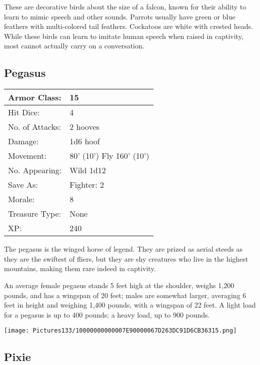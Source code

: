 \documentclass[a4paper,twoside,openany,10pt]{book}
\begin{document}
\begin{multicols}{2}
These are decorative birds about the size of a falcon, known for their ability to learn to mimic speech and other sounds. Parrots usually have green or blue feathers with multi-colored tail feathers. Cockatoos are white with crested heads. While these birds can learn to imitate human speech when raised in captivity, most cannot actually carry on a conversation.

\subsection*{Pegasus}\label{pegasus}

\begin{tabularx}{0.50\textwidth}{@{}lX@{}}
Armor Class: & 15 \\\hline
Hit Dice: & 4 \\\hline
No. of Attacks: & 2 hooves \\\hline
Damage: & 1d6 hoof \\\hline
Movement: & 80' (10') Fly
160' (10') \\\hline
No. Appearing: & Wild 1d12 \\\hline
Save As: & Fighter: 2 \\\hline
Morale: & 8 \\\hline
Treasure Type: & None \\\hline
XP: & 240 \\\hline
\end{tabularx}\medskip

The pegasus is the winged horse of legend. They are prized as aerial steeds as they are the swiftest of fliers, but they are shy creatures who live in the highest mountains, making them rare indeed in captivity. 

An average female pegasus stands 5 feet high at the shoulder, weighs 1,200 pounds, and has a wingspan of 20 feet; males are somewhat larger, averaging 6 feet in height and weighing 1,400 pounds, with a wingspan of 22 feet. A light load for a pegasus is up to 400 pounds; a heavy load, up to 900 pounds.

 \begin{center}
 	\texttt{[image: Pictures133/10000000000007E90000067D263DC91D6CB36315.png]} 
 \end{center}

\subsection*{Pixie}\label{pixie}


\end{multicols}
\end{document}
